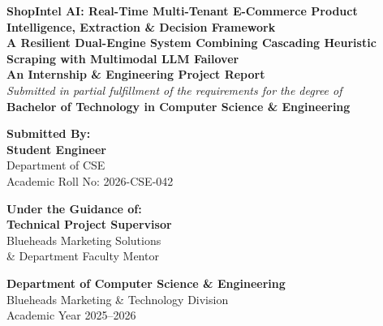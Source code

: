 \documentclass[12pt,a4paper,oneside]{report}
\begin{document}
\begin{titlepage}
\begin{center}
    \vspace*{0.5cm}
    
    {\Huge \textbf{\color{slate}ShopIntel AI: Real-Time Multi-Tenant E-Commerce Product Intelligence, Extraction \& Decision Framework}}\\[0.6cm]
    {\Large \textbf{\color{indigo}A Resilient Dual-Engine System Combining Cascading Heuristic Scraping with Multimodal LLM Failover}}\\[1.5cm]
    
    \textbf{\large An Internship \& Engineering Project Report}\\[0.4cm]
    \textit{Submitted in partial fulfillment of the requirements for the degree of}\\[0.4cm]
    \textbf{\Large Bachelor of Technology in Computer Science \& Engineering}\\[2.0cm]
    
    \begin{minipage}{0.45\textwidth}
        \begin{flushleft} \large
            \textbf{\color{slate}Submitted By:}\\[0.2cm]
            \textbf{Student Engineer}\\[0.1cm]
            Department of CSE\\[0.1cm]
            Academic Roll No: 2026-CSE-042
        \end{flushleft}
    \end{minipage}
    \begin{minipage}{0.45\textwidth}
        \begin{flushright} \large
            \textbf{\color{slate}Under the Guidance of:}\\[0.2cm]
            \textbf{Technical Project Supervisor}\\[0.1cm]
            Blueheads Marketing Solutions\\[0.1cm]
            \& Department Faculty Mentor
        \end{flushright}
    \end{minipage}
    
    \vfill
    
    {\large \textbf{Department of Computer Science \& Engineering}}\\[0.2cm]
    {\large Blueheads Marketing \& Technology Division}\\[0.2cm]
    {\large Academic Year 2025--2026}\\[0.5cm]
    
\end{center}
\end{titlepage}
\end{document}
